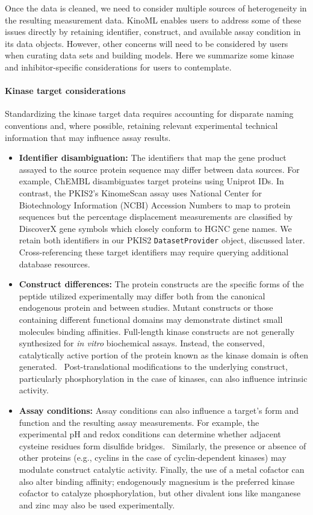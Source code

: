 \documentclass[9pt,lessons]{livecoms}
\begin{document}
Once the data is cleaned, we need to consider multiple sources of heterogeneity in the resulting measurement data. KinoML enables users to address some of these issues directly by retaining identifier, construct, and available assay condition in its data objects. However, other concerns will need to be considered by users when curating data sets and building models. Here we summarize some kinase and inhibitor-specific considerations for users to contemplate.

\paragraph{Kinase target considerations}
Standardizing the kinase target data requires accounting for disparate naming conventions and, where possible, retaining relevant experimental technical information that may influence assay results.
\begin{itemize}
\item {\bf Identifier disambiguation:} The identifiers that map the gene product assayed to the source protein sequence may differ between data sources. For example, ChEMBL disambiguates target proteins using Uniprot IDs. In contrast, the PKIS2's KinomeScan assay uses National Center for Biotechnology Information (NCBI) Accession Numbers to map to protein sequences but the percentage displacement measurements are classified by DiscoverX gene symbols which closely conform to HGNC gene names. We retain both identifiers in our PKIS2 \texttt{DatasetProvider} object, discussed later. Cross-referencing these target identifiers may require querying additional database resources. 
\item {\bf Construct differences:} The protein constructs are the specific forms of the peptide utilized experimentally may differ both from the canonical endogenous protein and between studies. Mutant constructs or those containing different functional domains may demonstrate distinct small molecules binding affinities. Full-length kinase constructs are not generally synthesized for \textit{in vitro} biochemical assays. Instead, the conserved, catalytically active portion of the protein known as the kinase domain is often generated.~\cite{diwanji2019full} Post-translational modifications to the underlying construct, particularly phosphorylation in the case of kinases, can also influence intrinsic activity.
\item {\bf Assay conditions:} Assay conditions can also influence a target's form and function and the resulting assay measurements. For example, the experimental pH and redox conditions can determine whether adjacent cysteine residues form disulfide bridges.~\cite{ruiz2022disulfide} Similarly, the presence or absence of other proteins (e.g., cyclins in the case of cyclin-dependent kinases) may modulate construct catalytic activity. Finally, the use of a metal cofactor can also alter binding affinity; endogenously magnesium is the preferred kinase cofactor to catalyze phosphorylation, but other divalent ions like manganese and zinc may also be used experimentally.~\cite{knape2017cofactor}
\end{itemize}
\end{document}
